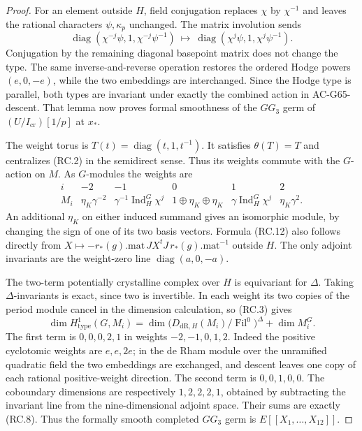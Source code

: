 \begin{proof}
For an element outside \(H\), field conjugation
replaces \(\chi\) by \(\chi^{-1}\) and leaves the
rational characters \(\psi,\kappa_p\) unchanged.
The matrix involution sends
\[
 \operatorname{diag}(\chi^{-j}\psi,1,\chi^{-j}\psi^{-1})
       \ \longmapsto\
 \operatorname{diag}(\chi^j\psi,1,\chi^j\psi^{-1}).
 \tag{RC.11}
\]
Conjugation by the remaining diagonal basepoint
matrix does not change the type.  The same
inverse-and-reverse operation restores the ordered
Hodge powers \((e,0,-e)\), while the two embeddings
are interchanged.  Since the Hodge type is parallel,
both types are invariant under exactly the combined
action in AC-G65-descent.  That lemma now proves
formal smoothness of the \(GG_3\) germ of
\((U/I_{\mathrm{cr}})[1/p]\) at \(x_*\).

The weight torus is \(T(t)=\operatorname{diag}(t,1,t^{-1})\).
It satisfies \(\theta(T)=T\) and centralizes (RC.2)
in the semidirect sense.  Thus its weights commute
with the \(G\)-action on \(M\).
As \(G\)-modules the weights are
\[
\begin{array}{c|ccccc}
i&-2&-1&0&1&2\\ \hline
M_i&
\eta_K\gamma^{-2}&
\gamma^{-1}\operatorname{Ind}_H^G\chi^j&
1\oplus\eta_K\oplus\eta_K&
\gamma\operatorname{Ind}_H^G\chi^j&
\eta_K\gamma^2 .
\end{array}
 \tag{RC.12}
\]
An additional \(\eta_K\) on either induced summand
gives an isomorphic module, by changing the sign
of one of its two basis vectors.  Formula (RC.12)
also follows directly from
\(X\mapsto-r_*(g).\mathrm{mat}\,JX^tJ\,
             r_*(g).\mathrm{mat}^{-1}\) outside \(H\).
The only adjoint invariants are the weight-zero
line \(\operatorname{diag}(a,0,-a)\).

The two-term potentially crystalline complex over
\(H\) is equivariant for \(\Delta\).  Taking
\(\Delta\)-invariants is exact, since two is invertible.
In each weight its two copies of the period module
cancel in the dimension calculation, so (RC.3) gives
\[
 \dim H^1_{\mathrm{type}}(G,M_i)
   =\dim\bigl(D_{\mathrm{dR},H}(M_i)/
                 \operatorname{Fil}^0\bigr)^\Delta
                      +\dim M_i^G.
 \tag{RC.13}
\]
The first term is \(0,0,0,2,1\) in weights
\(-2,-1,0,1,2\).  Indeed the positive cyclotomic
weights are \(e,e,2e\); in the de Rham module over
the unramified quadratic field the two embeddings
are exchanged, and descent leaves one copy of
each rational positive-weight direction.
The second term is \(0,0,1,0,0\).
The coboundary dimensions are respectively
\(1,2,2,2,1\), obtained by subtracting the invariant
line from the nine-dimensional adjoint space.
Their sums are exactly (RC.8).  Thus the formally
smooth completed \(GG_3\) germ is \(E[[X_1,\ldots,X_{12}]]\).


\end{proof}
